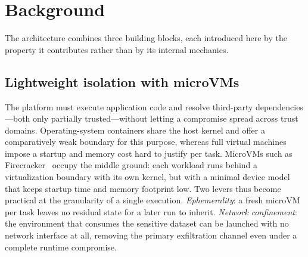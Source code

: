 \documentclass[runningheads]{llncs}
\begin{document}






\section{Background}\label{sec:background}


The architecture combines three building blocks, each introduced here by the property it
contributes rather than by its internal mechanics.

\subsection{Lightweight isolation with microVMs}
The platform must execute application code and resolve third-party dependencies---both only
partially trusted---without letting a compromise spread across trust domains.
Operating-system containers share the host kernel and offer a comparatively weak boundary
for this purpose, whereas full virtual machines impose a startup and memory cost hard to
justify per task. MicroVMs such as Firecracker~\cite{agache2020firecracker} occupy the
middle ground: each workload runs behind a virtualization boundary with its own kernel, but
with a minimal device model that keeps startup time and memory footprint low. Two levers
thus become practical at the granularity of a single execution. \emph{Ephemerality}: a
fresh microVM per task leaves no residual state for a later run to inherit. \emph{Network
confinement}: the environment that consumes the sensitive dataset can be launched with no
network interface at all, removing the primary exfiltration channel even under a complete
runtime compromise.
\end{document}
